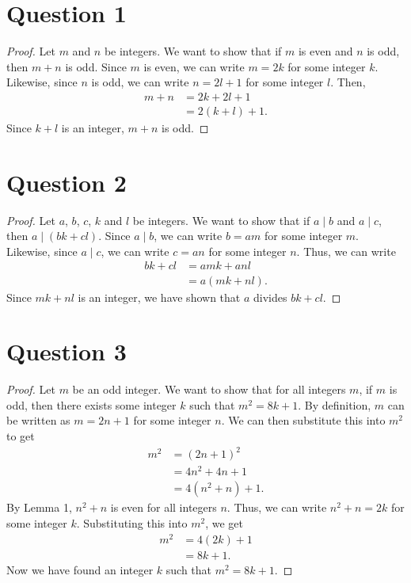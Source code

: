 \documentclass{article}
\begin{document}
\section*{Question 1}
\begin{proof}
    Let $m$ and $n$ be integers. 
    We want to show that if $m$ is even and $n$ is odd, then $m+n$ is odd.
    Since $m$ is even, we can write $m = 2k$ for some integer $k$.
    Likewise, since $n$ is odd, we can write $n = 2l+1$ for some integer $l$.
    Then, 
    \begin{align*}
        m+n &= 2k + 2l + 1 \\
        &= 2(k+l) + 1.
    \end{align*}
    Since $k+l$ is an integer, $m+n$ is odd.
\end{proof}

\section*{Question 2}
\begin{proof}
    Let $a$, $b$, $c$, $k$ and $l$ be integers.
    We want to show that if $a \mid b$ and $a \mid c$, then $a \mid (bk + cl)$.
    Since $a \mid b$, we can write $b = am$ for some integer $m$.
    Likewise, since $a \mid c$, we can write $c = an$ for some integer $n$.
    Thus, we can write
    \begin{align*}
        bk + cl &= amk + anl \\
        &= a(mk + nl).
    \end{align*}
    Since $mk + nl$ is an integer, we have shown that $a$ divides $bk + cl$.
\end{proof}

\section*{Question 3}
\begin{proof}
    Let $m$ be an odd integer.
    We want to show that for all integers $m$, if $m$ is odd, then there exists some integer $k$ such that $m^2 = 8k + 1$.
    By definition, $m$ can be written as $m = 2n + 1$ for some integer $n$.
    We can then substitute this into $m^2$ to get
    \begin{align*}
        m^2 &= (2n + 1)^2 \\
        &= 4n^2 + 4n + 1 \\
        &= 4(n^2 + n) + 1.
    \end{align*}
    By Lemma 1, $n^2 + n$ is even for all integers $n$.
    Thus, we can write $n^2 + n = 2k$ for some integer $k$.
    Substituting this into $m^2$, we get
    \begin{align*}
        m^2 &= 4(2k) + 1 \\
        &= 8k + 1.
    \end{align*}
    Now we have found an integer $k$ such that $m^2 = 8k + 1$.
\end{proof}
\end{document}

